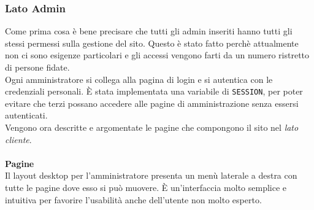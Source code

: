 \subsubsection{Lato Admin}
Come prima cosa è bene precisare che tutti gli admin inseriti hanno tutti gli stessi permessi sulla gestione del sito. Questo è stato fatto perchè attualmente non ci sono esigenze particolari e gli accessi vengono farti da un numero ristretto di persone fidate.\\
Ogni amministratore si collega alla pagina di login e si autentica con le credenziali personali. È stata implementata una variabile di \texttt{SESSION}, per poter evitare che terzi possano accedere alle pagine di amministrazione senza essersi autenticati.\\
Vengono ora descritte e argomentate le pagine che compongono il sito nel \textit{lato cliente}.\\\\
\textbf{Pagine}\\ Il layout desktop per l'amministratore presenta un menù laterale a destra con tutte le pagine dove esso si può muovere. È un'interfaccia molto semplice e intuitiva per favorire l'usabilità anche dell'utente non molto esperto.
